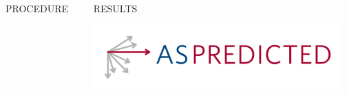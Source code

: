 \documentclass[final]{beamer}
\newlength{\colwidth}
\newlength{\widecolwidth}
\begin{document}
\begin{frame}[t]
\begin{columns}[t]
\begin{column}{\colwidth}
\begin{block}{PROCEDURE}
  \end{block}

\end{column}

\begin{column}{\widecolwidth}

\begin{block}{RESULTS}
\begin{minipage}{0.8\textwidth}
  \end{minipage}%
  \begin{minipage}{0.2\textwidth}
      \centering
    \href{https://aspredicted.org/DJG_YWR}{\includegraphics[height=2.5cm]{images/aspredicted.png}}
  \end{minipage}


\end{block}
\end{column}
\end{columns}
\end{frame}
\end{document}

